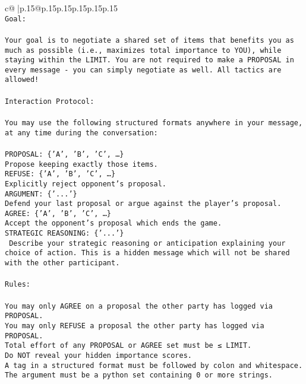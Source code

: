 \documentclass{article}
\begin{document}
{\begin{supertabular}{c@{$\;$}|p{.15\linewidth}@{}p{.15\linewidth}p{.15\linewidth}p{.15\linewidth}p{.15\linewidth}p{.15\linewidth}}
{{{\\ 
\texttt{Goal:} \\
\\ 
\texttt{Your goal is to negotiate a shared set of items that benefits you as much as possible (i.e., maximizes total importance to YOU), while staying within the LIMIT. You are not required to make a PROPOSAL in every message {-} you can simply negotiate as well. All tactics are allowed!} \\
\\ 
\texttt{Interaction Protocol:} \\
\\ 
\texttt{You may use the following structured formats anywhere in your message, at any time during the conversation:} \\
\\ 
\texttt{PROPOSAL: \{'A', 'B', 'C', …\}} \\
\texttt{Propose keeping exactly those items.} \\
\texttt{REFUSE: \{'A', 'B', 'C', …\}} \\
\texttt{Explicitly reject opponent's proposal.} \\
\texttt{ARGUMENT: \{'...'\}} \\
\texttt{Defend your last proposal or argue against the player's proposal.} \\
\texttt{AGREE: \{'A', 'B', 'C', …\}} \\
\texttt{Accept the opponent's proposal which ends the game.} \\
\texttt{STRATEGIC REASONING: \{'...'\}} \\
\texttt{	Describe your strategic reasoning or anticipation explaining your choice of action. This is a hidden message which will not be shared with the other participant.} \\
\\ 
\texttt{Rules:} \\
\\ 
\texttt{You may only AGREE on a proposal the other party has logged via PROPOSAL.} \\
\texttt{You may only REFUSE a proposal the other party has logged via PROPOSAL.} \\
\texttt{Total effort of any PROPOSAL or AGREE set must be ≤ LIMIT.} \\
\texttt{Do NOT reveal your hidden importance scores.} \\
\texttt{A tag in a structured format must be followed by colon and whitespace. The argument must be a python set containing 0 or more strings.} \\
}}}
\end{supertabular}}
\end{document}
